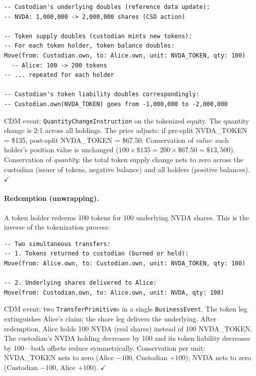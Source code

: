\documentclass[11pt,a4paper]{article}
\begin{document}
\begin{lstlisting}
-- Custodian's underlying doubles (reference data update):
-- NVDA: 1,000,000 -> 2,000,000 shares (CSD action)

-- Token supply doubles (custodian mints new tokens):
-- For each token holder, token balance doubles:
Move(from: Custodian.own, to: Alice.own, unit: NVDA_TOKEN, qty: 100)
  -- Alice: 100 -> 200 tokens
-- ... repeated for each holder

-- Custodian's token liability doubles correspondingly:
-- Custodian.own(NVDA_TOKEN) goes from -1,000,000 to -2,000,000
\end{lstlisting}

\noindent CDM event: \texttt{QuantityChangeInstruction} on the tokenized equity. The quantity change is 2:1 across all holdings. The price adjusts: if pre-split NVDA\_TOKEN = \$135, post-split NVDA\_TOKEN = \$67.50. Conservation of \emph{value}: each holder's position value is unchanged ($100 \times \$135 = 200 \times \$67.50 = \$13{,}500$). Conservation of \emph{quantity}: the total token supply change nets to zero across the custodian (issuer of tokens, negative balance) and all holders (positive balances). $\checkmark$

\paragraph{Redemption (unwrapping).} A token holder redeems 100 tokens for 100 underlying NVDA shares. This is the inverse of the tokenization process:

\begin{lstlisting}
-- Two simultaneous transfers:
-- 1. Tokens returned to custodian (burned or held):
Move(from: Alice.own, to: Custodian.own, unit: NVDA_TOKEN, qty: 100)

-- 2. Underlying shares delivered to Alice:
Move(from: Custodian.own, to: Alice.own, unit: NVDA, qty: 100)
\end{lstlisting}

\noindent CDM event: two \texttt{TransferPrimitive}s in a single \texttt{BusinessEvent}. The token leg extinguishes Alice's claim; the share leg delivers the underlying. After redemption, Alice holds 100 NVDA (real shares) instead of 100 NVDA\_TOKEN. The custodian's NVDA holding decreases by 100 and its token liability decreases by 100---both offsets reduce symmetrically. Conservation per unit: NVDA\_TOKEN nets to zero (Alice $-100$, Custodian $+100$); NVDA nets to zero (Custodian $-100$, Alice $+100$). $\checkmark$
\end{document}
